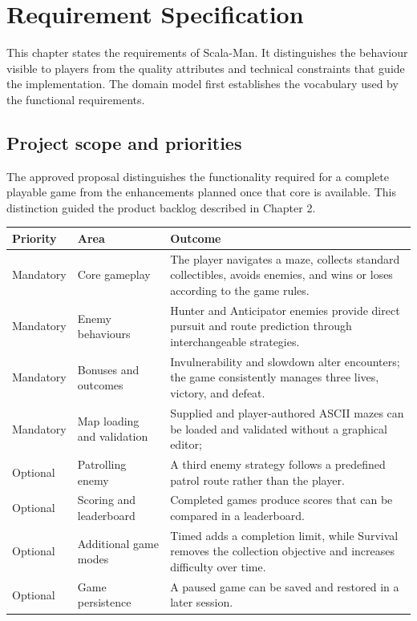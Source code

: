 \chapter{Requirement Specification}

This chapter states the requirements of Scala-Man. It distinguishes the behaviour visible to players from the
quality attributes and technical constraints that guide the implementation. The domain model first establishes the
vocabulary used by the functional requirements.

\section{Project scope and priorities}

The approved proposal distinguishes the functionality required for a complete playable game from the enhancements
planned once that core is available. This distinction guided the product backlog described in Chapter 2.

\begin{center}
  \begin{tabular}{|>{\raggedright\arraybackslash}p{2.2cm}|>{\raggedright\arraybackslash}p{3.4cm}|>{\raggedright\arraybackslash}p{7cm}|}
    \hline
    \textbf{Priority} & \textbf{Area} & \textbf{Outcome} \\
    \hline
    Mandatory & Core gameplay & The player navigates a maze, collects standard collectibles, avoids enemies, and wins
    or loses according to the game rules. \\
    \hline
    Mandatory & Enemy behaviours & Hunter and Anticipator enemies provide direct pursuit and route prediction
    through interchangeable strategies. \\
    \hline
    Mandatory & Bonuses and outcomes & Invulnerability and slowdown alter encounters; the game consistently
    manages three lives, victory, and defeat. \\
    \hline
    Mandatory & Map loading and validation & Supplied and player-authored ASCII mazes can be loaded and
    validated without a graphical editor; \\
    \hline
    Optional & Patrolling enemy & A third enemy strategy follows a predefined patrol route rather than the
    player. \\
    \hline
    Optional & Scoring and leaderboard & Completed games produce scores that can be compared in a leaderboard. \\
    \hline
    Optional & Additional game modes & Timed adds a completion limit, while Survival removes the collection
    objective and increases difficulty over time. \\
    \hline
    Optional & Game persistence & A paused game can be saved and restored in a later session. \\
    \hline
  \end{tabular}
\end{center}

